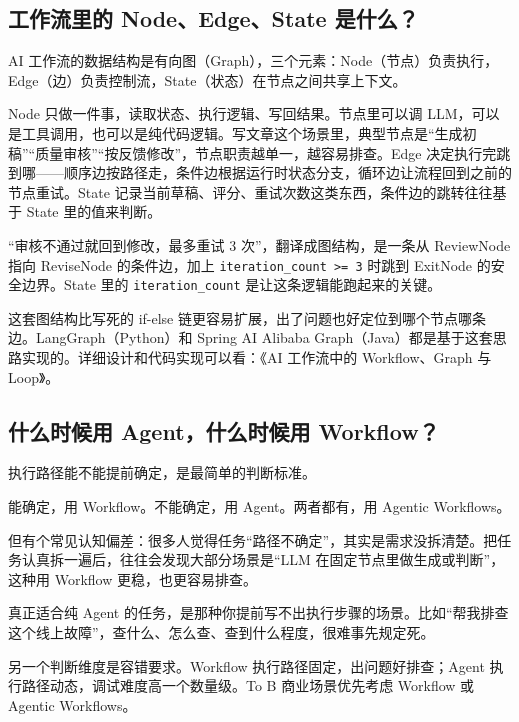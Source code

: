 \documentclass[10pt,a4paper]{ctexart}
\begin{document}
\subsection{工作流里的 Node、Edge、State 是什么？}


AI 工作流的数据结构是有向图（Graph），三个元素：Node（节点）负责执行，Edge（边）负责控制流，State（状态）在节点之间共享上下文。



Node 只做一件事，读取状态、执行逻辑、写回结果。节点里可以调 LLM，可以是工具调用，也可以是纯代码逻辑。写文章这个场景里，典型节点是“生成初稿”“质量审核”“按反馈修改”，节点职责越单一，越容易排查。Edge 决定执行完跳到哪——顺序边按路径走，条件边根据运行时状态分支，循环边让流程回到之前的节点重试。State 记录当前草稿、评分、重试次数这类东西，条件边的跳转往往基于 State 里的值来判断。



“审核不通过就回到修改，最多重试 3 次”，翻译成图结构，是一条从 ReviewNode 指向 ReviseNode 的条件边，加上 \texttt{iteration\_count >= 3} 时跳到 ExitNode 的安全边界。State 里的 \texttt{iteration\_count} 是让这条逻辑能跑起来的关键。



这套图结构比写死的 if-else 链更容易扩展，出了问题也好定位到哪个节点哪条边。LangGraph（Python）和 Spring AI Alibaba Graph（Java）都是基于这套思路实现的。详细设计和代码实现可以看：《AI 工作流中的 Workflow、Graph 与 Loop》。



\subsection{什么时候用 Agent，什么时候用 Workflow？}


执行路径能不能提前确定，是最简单的判断标准。



能确定，用 Workflow。不能确定，用 Agent。两者都有，用 Agentic Workflows。



但有个常见认知偏差：很多人觉得任务“路径不确定”，其实是需求没拆清楚。把任务认真拆一遍后，往往会发现大部分场景是“LLM 在固定节点里做生成或判断”，这种用 Workflow 更稳，也更容易排查。



真正适合纯 Agent 的任务，是那种你提前写不出执行步骤的场景。比如“帮我排查这个线上故障”，查什么、怎么查、查到什么程度，很难事先规定死。



另一个判断维度是容错要求。Workflow 执行路径固定，出问题好排查；Agent 执行路径动态，调试难度高一个数量级。To B 商业场景优先考虑 Workflow 或 Agentic Workflows。
\end{document}
